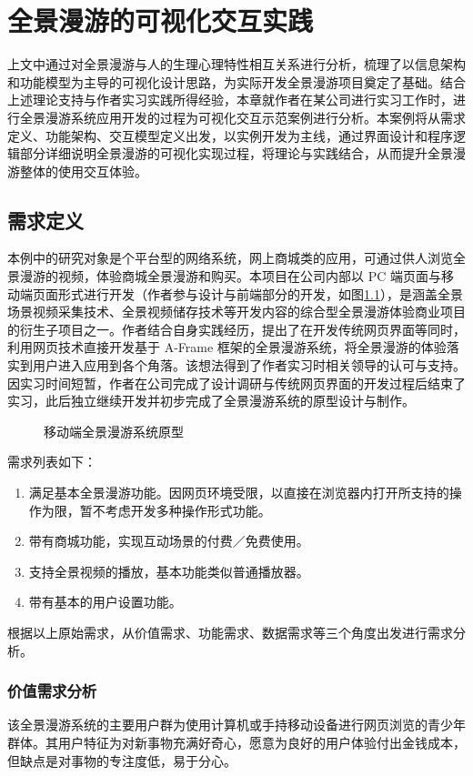 \chapter{全景漫游的可视化交互实践}
上文中通过对全景漫游与人的生理心理特性相互关系进行分析，梳理了以信息架构和功能模型为主导的可视化设计思路，为实际开发全景漫游项目奠定了基础。结合上述理论支持与作者实习实践所得经验，本章就作者在某公司进行实习工作时，进行全景漫游系统应用开发的过程为可视化交互示范案例进行分析。本案例将从需求定义、功能架构、交互模型定义出发，以实例开发为主线，通过界面设计和程序逻辑部分详细说明全景漫游的可视化实现过程，将理论与实践结合，从而提升全景漫游整体的使用交互体验。

\section{需求定义}
本例中的研究对象是个平台型的网络系统，网上商城类的应用，可通过供人浏览全景漫游的视频，体验商城全景漫游和购买。本项目在公司内部以 PC 端页面与移动端页面形式进行开发（作者参与设计与前端部分的开发，如图\ref{fig:woniu}），是涵盖全景场景视频采集技术、全景视频储存技术等开发内容的综合型全景漫游体验商业项目的衍生子项目之一。作者结合自身实践经历，提出了在开发传统网页界面等同时，利用网页技术直接开发基于 A-Frame 框架的全景漫游系统，将全景漫游的体验落实到用户进入应用到各个角落。该想法得到了作者实习时相关领导的认可与支持。因实习时间短暂，作者在公司完成了设计调研与传统网页界面的开发过程后结束了实习，此后独立继续开发并初步完成了全景漫游系统的原型设计与制作。

\begin{figure}[htp]
\centering
{}
\caption{移动端全景漫游系统原型}
\label{fig:woniu}
\end{figure}

需求列表如下：
\begin{enumerate}
	\item 满足基本全景漫游功能。因网页环境受限，以直接在浏览器内打开所支持的操作为限，暂不考虑开发多种操作形式功能。
	\item 带有商城功能，实现互动场景的付费／免费使用。
	\item 支持全景视频的播放，基本功能类似普通播放器。
	\item 带有基本的用户设置功能。
\end{enumerate}

根据以上原始需求，从价值需求、功能需求、数据需求等三个角度出发进行需求分析。

\subsection{价值需求分析}
该全景漫游系统的主要用户群为使用计算机或手持移动设备进行网页浏览的青少年群体。其用户特征为对新事物充满好奇心，愿意为良好的用户体验付出金钱成本，但缺点是对事物的专注度低，易于分心。

